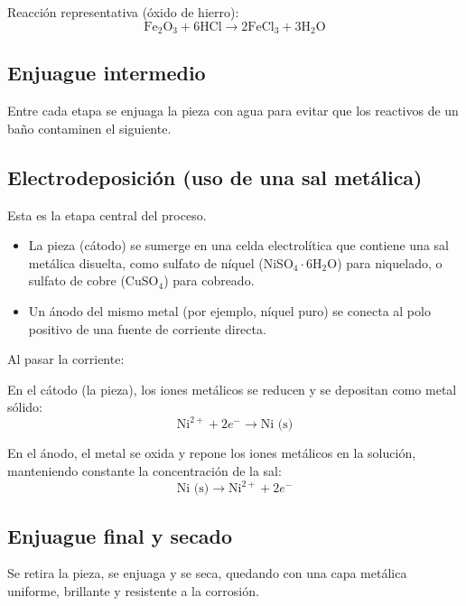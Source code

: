 \documentclass{article}
\begin{document}
Reacción representativa (óxido de hierro):
\begin{equation}
    \text{Fe}_2\text{O}_3 + 6\text{HCl} \rightarrow 2\text{FeCl}_3 + 3\text{H}_2\text{O}
\end{equation}

\subsection{Enjuague intermedio}

Entre cada etapa se enjuaga la pieza con agua para evitar que los reactivos de un baño contaminen el siguiente.

\subsection{Electrodeposición (uso de una sal metálica)}

Esta es la etapa central del proceso.

\begin{itemize}
    \item La pieza (cátodo) se sumerge en una celda electrolítica que contiene una sal metálica disuelta, como sulfato de níquel (NiSO$_4\cdot$6H$_2$O) para niquelado, o sulfato de cobre (CuSO$_4$) para cobreado.
    \item Un ánodo del mismo metal (por ejemplo, níquel puro) se conecta al polo positivo de una fuente de corriente directa.
\end{itemize}

Al pasar la corriente:

En el cátodo (la pieza), los iones metálicos se reducen y se depositan como metal sólido:
\begin{equation}
    \text{Ni}^{2+} + 2e^- \rightarrow \text{Ni (s)}
\end{equation}

En el ánodo, el metal se oxida y repone los iones metálicos en la solución, manteniendo constante la concentración de la sal:
\begin{equation}
    \text{Ni (s)} \rightarrow \text{Ni}^{2+} + 2e^-
\end{equation}

\subsection{Enjuague final y secado}

Se retira la pieza, se enjuaga y se seca, quedando con una capa metálica uniforme, brillante y resistente a la corrosión.
\end{document}

